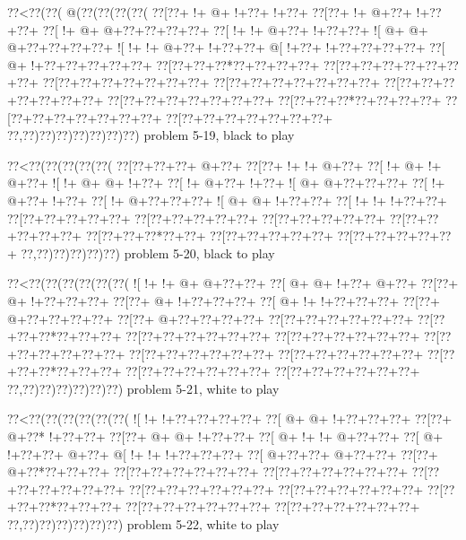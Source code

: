 \vbox{\vbox{\goo
\0??<\0??(\0??(\- @(\0??(\0??(\0??(\0??(
\0??[\0??+\- !+\- @+\- !+\0??+\- !+\0??+
\0??[\0??+\- !+\- @+\0??+\- !+\0??+\0??+
\0??[\- !+\- @+\- @+\0??+\0??+\0??+\0??+
\0??[\- !+\- !+\- @+\0??+\- !+\0??+\0??+
\- ![\- @+\- @+\- @+\0??+\0??+\0??+\0??+
\- ![\- !+\- !+\- @+\0??+\- !+\0??+\0??+
\- @[\- !+\0??+\- !+\0??+\0??+\0??+\0??+
\0??[\- @+\- !+\0??+\0??+\0??+\0??+\0??+
\0??[\0??+\0??+\0??*\0??+\0??+\0??+\0??+
\0??[\0??+\0??+\0??+\0??+\0??+\0??+\0??+
\0??[\0??+\0??+\0??+\0??+\0??+\0??+\0??+
\0??[\0??+\0??+\0??+\0??+\0??+\0??+\0??+
\0??[\0??+\0??+\0??+\0??+\0??+\0??+\0??+
\0??[\0??+\0??+\0??+\0??+\0??+\0??+\0??+
\0??[\0??+\0??+\0??*\0??+\0??+\0??+\0??+
\0??[\0??+\0??+\0??+\0??+\0??+\0??+\0??+
\0??[\0??+\0??+\0??+\0??+\0??+\0??+\0??+
\0??,\0??)\0??)\0??)\0??)\0??)\0??)\0??)
}
\hfil problem 5-19, black to play\hfil\break
}

\vbox{\vbox{\goo
\0??<\0??(\0??(\0??(\0??(\0??(
\0??[\0??+\0??+\0??+\- @+\0??+
\0??[\0??+\- !+\- !+\- @+\0??+
\0??[\- !+\- @+\- !+\- @+\0??+
\- ![\- !+\- @+\- @+\- !+\0??+
\0??[\- !+\- @+\0??+\- !+\0??+
\- ![\- @+\- @+\0??+\0??+\0??+
\0??[\- !+\- @+\0??+\- !+\0??+
\0??[\- !+\- @+\0??+\0??+\0??+
\- ![\- @+\- @+\- !+\0??+\0??+
\0??[\- !+\- !+\- !+\0??+\0??+
\0??[\0??+\0??+\0??+\0??+\0??+
\0??[\0??+\0??+\0??+\0??+\0??+
\0??[\0??+\0??+\0??+\0??+\0??+
\0??[\0??+\0??+\0??+\0??+\0??+
\0??[\0??+\0??+\0??*\0??+\0??+
\0??[\0??+\0??+\0??+\0??+\0??+
\0??[\0??+\0??+\0??+\0??+\0??+
\0??,\0??)\0??)\0??)\0??)\0??)
}
\hfil problem 5-20, black to play\hfil\break
}

\vbox{\vbox{\goo
\0??<\0??(\0??(\0??(\0??(\0??(\0??(
\- ![\- !+\- !+\- @+\- @+\0??+\0??+
\0??[\- @+\- @+\- !+\0??+\- @+\0??+
\0??[\0??+\- @+\- !+\0??+\0??+\0??+
\0??[\0??+\- @+\- !+\0??+\0??+\0??+
\0??[\- @+\- !+\- !+\0??+\0??+\0??+
\0??[\0??+\- @+\0??+\0??+\0??+\0??+
\0??[\0??+\- @+\0??+\0??+\0??+\0??+
\0??[\0??+\0??+\0??+\0??+\0??+\0??+
\0??[\0??+\0??+\0??*\0??+\0??+\0??+
\0??[\0??+\0??+\0??+\0??+\0??+\0??+
\0??[\0??+\0??+\0??+\0??+\0??+\0??+
\0??[\0??+\0??+\0??+\0??+\0??+\0??+
\0??[\0??+\0??+\0??+\0??+\0??+\0??+
\0??[\0??+\0??+\0??+\0??+\0??+\0??+
\0??[\0??+\0??+\0??*\0??+\0??+\0??+
\0??[\0??+\0??+\0??+\0??+\0??+\0??+
\0??[\0??+\0??+\0??+\0??+\0??+\0??+
\0??,\0??)\0??)\0??)\0??)\0??)\0??)
}
\hfil problem 5-21, white to play\hfil\break
}

\vbox{\vbox{\goo
\0??<\0??(\0??(\0??(\0??(\0??(\0??(
\- ![\- !+\- !+\0??+\0??+\0??+\0??+
\0??[\- @+\- @+\- !+\0??+\0??+\0??+
\0??[\0??+\- @+\0??*\- !+\0??+\0??+
\0??[\0??+\- @+\- @+\- !+\0??+\0??+
\0??[\- @+\- !+\- !+\- @+\0??+\0??+
\0??[\- @+\- !+\0??+\0??+\- @+\0??+
\- @[\- !+\- !+\- !+\0??+\0??+\0??+
\0??[\- @+\0??+\0??+\- @+\0??+\0??+
\0??[\0??+\- @+\0??*\0??+\0??+\0??+
\0??[\0??+\0??+\0??+\0??+\0??+\0??+
\0??[\0??+\0??+\0??+\0??+\0??+\0??+
\0??[\0??+\0??+\0??+\0??+\0??+\0??+
\0??[\0??+\0??+\0??+\0??+\0??+\0??+
\0??[\0??+\0??+\0??+\0??+\0??+\0??+
\0??[\0??+\0??+\0??*\0??+\0??+\0??+
\0??[\0??+\0??+\0??+\0??+\0??+\0??+
\0??[\0??+\0??+\0??+\0??+\0??+\0??+
\0??,\0??)\0??)\0??)\0??)\0??)\0??)
}
\hfil problem 5-22, white to play\hfil\break
}

